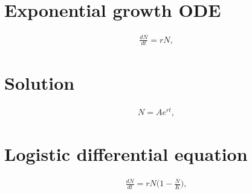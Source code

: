 \section*{Exponential growth ODE}

\begin{align*}
    \frac{dN}{dt} = r N,
\end{align*}


\section*{Solution}

\begin{align*}
    N = A e^{r t},
\end{align*}

\section*{Logistic differential equation }

\begin{align*}
    \frac{dN}{dt} = r N \Big(1 - \frac{N}{K} \Big),
\end{align*}
